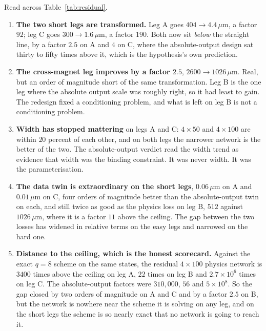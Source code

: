 \documentclass[11pt,a4paper]{article}
\newcommand{\um}{\ensuremath{\,\mu\mathrm{m}}}
\begin{document}
Read across Table~\ref{tab:residual}.

\begin{enumerate}
  \item \textbf{The two short legs are transformed.} Leg A goes $404 \to 4.4\um$,
  a factor $92$; leg C goes $300 \to 1.6\um$, a factor $190$. Both now sit
  \emph{below} the straight line, by a factor $2.5$ on A and $4$ on C, where the
  absolute-output design sat thirty to fifty times above it, which is the
  hypothesis's own prediction.
  \item \textbf{The cross-magnet leg improves by a factor $2.5$}, $2600 \to
  1026\um$. Real, but an order of magnitude short of the same transformation.
  Leg B is the one leg where the absolute output scale was roughly right, so it
  had least to gain. The redesign fixed a conditioning problem, and what is left
  on leg B is not a conditioning problem.
  \item \textbf{Width has stopped mattering} on legs A and C: $4 \times 50$ and
  $4 \times 100$ are within $20$ percent of each other, and on both legs the
  narrower network is the better of the two. The absolute-output verdict read
  the width trend as evidence that width was the binding constraint. It was
  never width. It was the parameterisation.
  \item \textbf{The data twin is extraordinary on the short legs}, $0.06\um$ on
  A and $0.01\um$ on C, four orders of magnitude better than the
  absolute-output twin on each, and still twice as good as the physics loss on
  leg B, $512$ against $1026\um$, where it is a factor $11$ above the ceiling.
  The gap between the two losses has widened in relative terms on the easy legs
  and narrowed on the hard one.
  \item \textbf{Distance to the ceiling, which is the honest scorecard.} Against
  the exact $q = 8$ scheme on the same states, the residual $4 \times 100$
  physics network is $3400$ times above the ceiling on leg A, $22$ times on leg
  B and $2.7 \times 10^{6}$ times on leg C. The absolute-output factors were
  $310{,}000$, $56$ and $5 \times 10^{8}$. So the gap closed by two orders of
  magnitude on A and C and by a factor $2.5$ on B, but the network is nowhere
  near the scheme it is solving on any leg, and on the short legs the scheme is
  so nearly exact that no network is going to reach it.
\end{enumerate}
\end{document}
